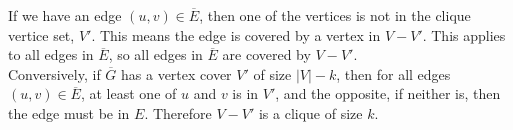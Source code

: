 \documentclass[a4paper]{article}
\begin{document}
If we have an edge $(u, v)\in \overline{E}$, then one of the vertices is not in the clique vertice set, $V'$. This means the edge is covered by a vertex in $V-V'$. This applies to all edges in $\overline{E}$, so all edges in $\overline{E}$ are covered by $V-V'$.\\
Conversively, if $\overline{G}$ has a vertex cover $V'$ of size $|V|-k$, then for all edges $(u,v)\in \overline{E}$, at least one of $u$ and $v$ is in $V'$, and the opposite, if neither is, then the edge must be in $E$. Therefore $V-V'$ is a clique of size $k$.
\end{document}
